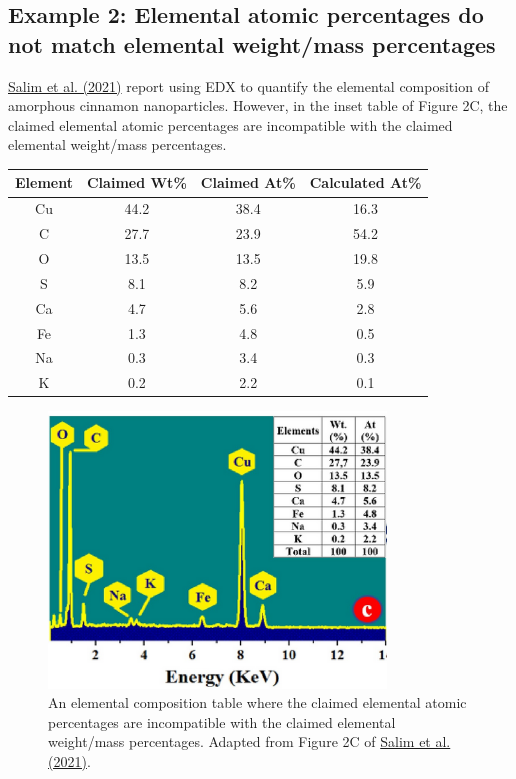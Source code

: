 \documentclass[letterpaper, 12pt]{article}
\begin{document}
\pagebreak

\subsection*{Example 2: Elemental atomic percentages do not match elemental weight/mass percentages}

\href{https://doi.org/10.1016/j.photonics.2020.100889}{Salim et al. (2021)} report using EDX to quantify the elemental composition of amorphous cinnamon nanoparticles. However, in the inset table of Figure 2C, the claimed elemental atomic percentages are incompatible with the claimed elemental weight/mass percentages.

\begin{table}[h!tbp]
\begin{center}
\begin{tabular}{c|c|c|c}
Element & Claimed Wt\% 	& Claimed At\% 	& Calculated At\%\\
\hline
Cu 	& 44.2 	& 38.4 	& 16.3\\
C 	& 27.7 	& 23.9 	& 54.2\\
O 	& 13.5 	& 13.5 	& 19.8\\
S 	& 8.1 	& 8.2 	& 5.9\\
Ca 	& 4.7 	& 5.6 	& 2.8\\
Fe 	& 1.3 	& 4.8 	& 0.5\\
Na 	& 0.3 	& 3.4 	& 0.3\\
K 	& 0.2 	& 2.2 	& 0.1\\
\end{tabular}
\end{center}
\end{table}

\begin{figure}[h!tbp]
    \centering
    \includegraphics[width=0.8\textwidth]{img/elemental_composition/salim_table.png}
    \caption*{An elemental composition table where the claimed elemental atomic percentages are incompatible with the claimed elemental weight/mass percentages. Adapted from Figure 2C of \href{https://doi.org/10.1016/j.photonics.2020.100889}{Salim et al. (2021)}.}
\end{figure}
\end{document}
